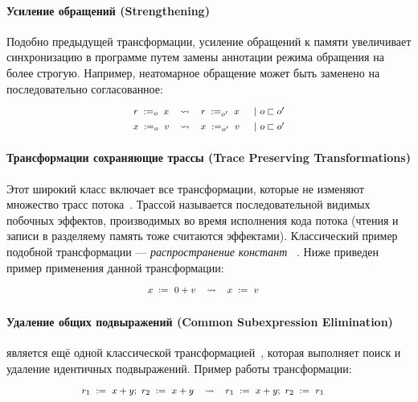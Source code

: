 \paragraph{
Усиление обращений
(Strengthening)
}

Подобно предыдущей трансформации, 
усиление обращений к памяти 
увеличивает синхронизацию в программе 
путем замены аннотации режима обращения на более строгую.
Например, неатомарное обращение может быть заменено на 
последовательно согласованное: 
%
\[\def\arraystretch{1.4}\footnotesize
  \begin{array}{cccl} 

      \readInst{o}{r}{x} 
    & \leadsto 
    & \readInst{o'}{r}{x}
    & ~|~ o \sqsubset o' \\ 

      \writeInst{o}{x}{v}
    & \leadsto 
    & \writeInst{o'}{x}{v}
    & ~|~ o \sqsubset o'  \\ 

  \end{array}
\]

\paragraph{
Трансформации сохраняющие трассы
(Trace Preserving Transformations)
}

Этот широкий класс включает все трансформации, 
которые не изменяют множество трасс потока~\cite{Sevcik-Aspinall:ECOOP08}.
Трассой называется последовательной видимых побочных эффектов,
производимых во время исполнения кода потока 
(чтения и записи в разделяему память тоже считаются эффектами).
Классический пример подобной трансформации --- 
\emph{распространение констант}%
~\cite{Muchnick:ACDI97, Wegman-Zadeck:TOPLAS91}.
Ниже приведен пример применения данной трансформации: 
%
\[\def\arraystretch{1.4}\footnotesize
  \begin{array}{cccl} 

      \writeInst{}{x}{0 + v} 
    & \leadsto 
    & \writeInst{}{x}{v}
    & \\ 

  \end{array}
\]
  
\paragraph{
Удаление общих подвыражений
(Common Subexpression Elimination)
}

\CSE является ещё одной классической трансформацией~\cite{Muchnick:ACDI97}, 
которая выполняет поиск и удаление идентичных подвыражений.
Пример работы трансформации:
%
\[\def\arraystretch{1.4}\footnotesize
  \begin{array}{cccl} 

      \readInst{}{r_1}{x + y} \seq \readInst{}{r_2}{x + y} 
    & \leadsto 
    & \readInst{}{r_1}{x + y} \seq \readInst{}{r_2}{r_1}
    & \\ 

  \end{array}
\]

